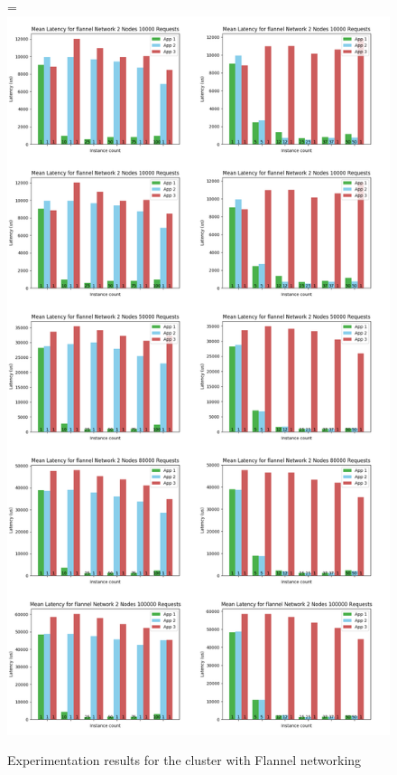 \documentclass[12pt,oneandhalf,chaparabic,ceng,ms,eng,oneside,pntc]{gsufbe}
\makeatletter
\let\old@includegraphics\includegraphics
\renewcommand{\includegraphics}[2][,]{%
  \setbox9=\hbox{\old@includegraphics[#1]{#2}}%
  \ifdim\wd9>\textwidth
    \old@includegraphics[#1,width=\textwidth]{#2}%
  \else
    \old@includegraphics[#1]{#2}%
  \fi%
}
\makeatother
\begin{document}
\begin{figure}
\centering
\includegraphics[]{flannel.png}
\caption{Experimentation results for the cluster with Flannel networking}
\label{flannel}
\end{figure}
\end{document}
